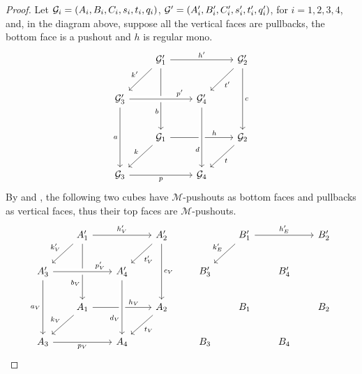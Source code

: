 \begin{proof}
	Let $\mathcal{G}_i = (A_i, B_i, C_i, s_i, t_i, q_i)$, $\mathcal{G}'=(A_i', B_i', C_i', s_i', t_i', q_i')$, for $i = 1, 2, 3, 4$, and, in the diagram above, suppose all the vertical faces are pullbacks, the bottom face is a pushout and $h$ is regular mono.
	\[\begin{tikzcd}[row sep=23, column sep =23]
	& {\mathcal{G}_1'} && {\mathcal{G}_2'} \\
	{\mathcal{G}_3'} && {\mathcal{G}_4'} \\
	& {\mathcal{G}_1} && {\mathcal{G}_2} \\
	{\mathcal{G}_3} && {\mathcal{G}_4}
	\arrow["{h'}", from=1-2, to=1-4]
	\arrow["{k'}"', from=1-2, to=2-1]
	\arrow["b"'{pos=0.7}, from=1-2, to=3-2]
	\arrow["{t'}", from=1-4, to=2-3]
	\arrow["c", from=1-4, to=3-4]
	\arrow["{p'}"{pos=0.8}, from=2-1, to=2-3, crossing over]
	\arrow["a"', from=2-1, to=4-1]
	\arrow["h"{pos=0.7}, from=3-2, to=3-4]
	\arrow["d"'{pos=0.7}, from=2-3, to=4-3, crossing over]
	\arrow["k"', from=3-2, to=4-1]
	\arrow["t", from=3-4, to=4-3]
	\arrow["p"', from=4-1, to=4-3]
	\end{tikzcd}\]
	By  and , the following two cubes have $\mathcal{M}$-pushouts as bottom faces and pullbacks as vertical faces, thus their top faces are $\mathcal{M}$-pushouts.
	\[\begin{tikzcd}[row sep=20, column sep = 20]
	& {A_1'} && {A_2'} \\
	{A_3'} && {A_4'} \\
	& {A_1} && {A_2} \\
	{A_3} && {A_4}
	\arrow["{h'_V}", from=1-2, to=1-4]
	\arrow["{k'_V}"', from=1-2, to=2-1]
	\arrow["{b_V}"'{pos=0.7}, from=1-2, to=3-2]
	\arrow["{t'_V}", from=1-4, to=2-3]
	\arrow["{c_V}", from=1-4, to=3-4]
	\arrow["{p'_V}"{pos=0.8}, from=2-1, to=2-3, crossing over]
	\arrow["{a_V}"', from=2-1, to=4-1]
	\arrow["{h_V}"{pos=0.7}, from=3-2, to=3-4]
	\arrow["{d_V}"'{pos=0.7}, from=2-3, to=4-3, crossing over]
	\arrow["{k_V}"', from=3-2, to=4-1]
	\arrow["{t_V}", from=3-4, to=4-3]
	\arrow["{p_V}"', from=4-1, to=4-3]
	\end{tikzcd}\qquad
	\begin{tikzcd}[row sep=20, column sep = 20]
	& {B_1'} && {B_2'} \\
	{B_3'} && {B_4'} \\
	& {B_1} && {B_2} \\
	{B_3} && {B_4}
	\arrow["{h'_E}", from=1-2, to=1-4]
	\arrow["{k'_E}"', from=1-2, to=2-1]

\end{tikzcd}\]
\end{proof}
